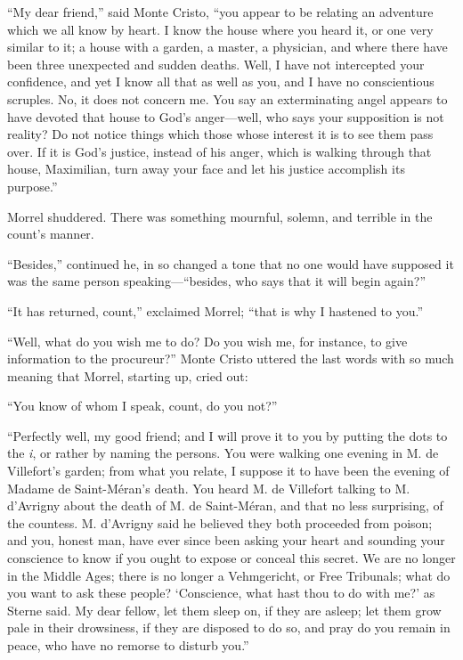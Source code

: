 “My dear friend,” said Monte Cristo, “you appear to be relating an
adventure which we all know by heart. I know the house where you heard
it, or one very similar to it; a house with a garden, a master, a
physician, and where there have been three unexpected and sudden
deaths. Well, I have not intercepted your confidence, and yet I know
all that as well as you, and I have no conscientious scruples. No, it
does not concern me. You say an exterminating angel appears to have
devoted that house to God’s anger—well, who says your supposition is
not reality? Do not notice things which those whose interest it is to
see them pass over. If it is God’s justice, instead of his anger, which
is walking through that house, Maximilian, turn away your face and let
his justice accomplish its purpose.”

Morrel shuddered. There was something mournful, solemn, and terrible in
the count’s manner.

“Besides,” continued he, in so changed a tone that no one would have
supposed it was the same person speaking—“besides, who says that it
will begin again?”

“It has returned, count,” exclaimed Morrel; “that is why I hastened to
you.”

“Well, what do you wish me to do? Do you wish me, for instance, to give
information to the procureur?” Monte Cristo uttered the last words with
so much meaning that Morrel, starting up, cried out:

“You know of whom I speak, count, do you not?”

“Perfectly well, my good friend; and I will prove it to you by putting
the dots to the \textit{i}, or rather by naming the persons. You were walking
one evening in M. de Villefort’s garden; from what you relate, I
suppose it to have been the evening of Madame de Saint-Méran’s death.
You heard M. de Villefort talking to M. d’Avrigny about the death of M.
de Saint-Méran, and that no less surprising, of the countess. M.
d’Avrigny said he believed they both proceeded from poison; and you,
honest man, have ever since been asking your heart and sounding your
conscience to know if you ought to expose or conceal this secret. We
are no longer in the Middle Ages; there is no longer a Vehmgericht, or
Free Tribunals; what do you want to ask these people? ‘Conscience, what
hast thou to do with me?’ as Sterne said. My dear fellow, let them
sleep on, if they are asleep; let them grow pale in their drowsiness,
if they are disposed to do so, and pray do you remain in peace, who
have no remorse to disturb you.”

